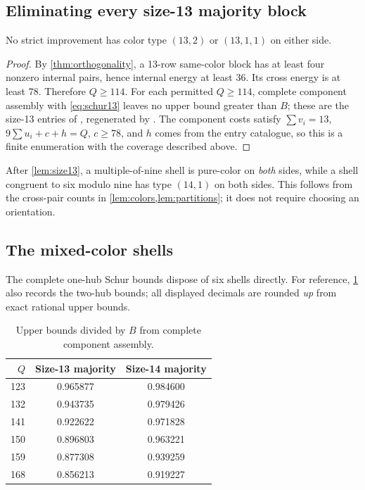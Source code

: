 \subsection{Eliminating every size-13 majority block}
\begin{lemma}\label{lem:size13}
No strict improvement has color type $(13,2)$ or $(13,1,1)$ on either side.
\end{lemma}
\begin{proof}
By \cref{thm:orthogonality}, a 13-row same-color block has at least four nonzero internal pairs, hence internal energy at least 36. Its cross energy is at least 78. Therefore $Q\ge114$. For each permitted $Q\ge114$, complete component assembly with \eqref{eq:schur13} leaves no upper bound greater than $B$; these are the size-13 entries of , regenerated by . The component costs satisfy $\sum v_i=13$, $9\sum u_i+c+h=Q$, $c\ge78$, and $h$ comes from the entry catalogue, so this is a finite enumeration with the coverage described above.
\end{proof}
After \cref{lem:size13}, a multiple-of-nine shell is pure-color on \emph{both} sides, while a shell congruent to six modulo nine has type $(14,1)$ on both sides. This follows from the cross-pair counts in \cref{lem:colors,lem:partitions}; it does not require choosing an orientation.

\subsection{The mixed-color shells}
The complete one-hub Schur bounds dispose of six shells directly. For reference, \cref{tab:schur} also records the two-hub bounds; all displayed decimals are rounded \emph{up} from exact rational upper bounds.
\begin{table}[ht]
\centering\caption{Upper bounds divided by $B$ from complete component assembly.}\label{tab:schur}
\begin{tabular}{@{}rcc@{}}\toprule
$Q$ & Size-13 majority & Size-14 majority\\\midrule
123&0.965877&0.984600\\
132&0.943735&0.979426\\
141&0.922622&0.971828\\
150&0.896803&0.963221\\
159&0.877308&0.939259\\
168&0.856213&0.919227\\
\bottomrule\end{tabular}
\end{table}

